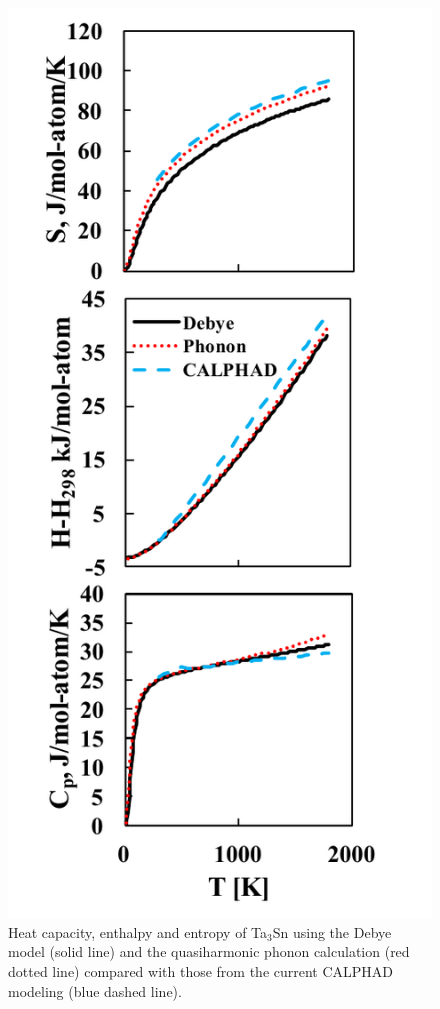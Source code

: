 \pagebreak
\begin{figure}[H]
	\centering
	\includegraphics[scale=1.0]{Chapter-4/Figures/Ta3Snfinitetemp.pdf}
	\caption{Heat capacity, enthalpy and entropy of Ta$_3$Sn using the Debye model (solid line) and the quasiharmonic phonon calculation (red dotted line) compared with those from the current CALPHAD modeling (blue dashed line).}
	\label{Ch4-figure:Ta3Snfinitetemp}
\end{figure}

